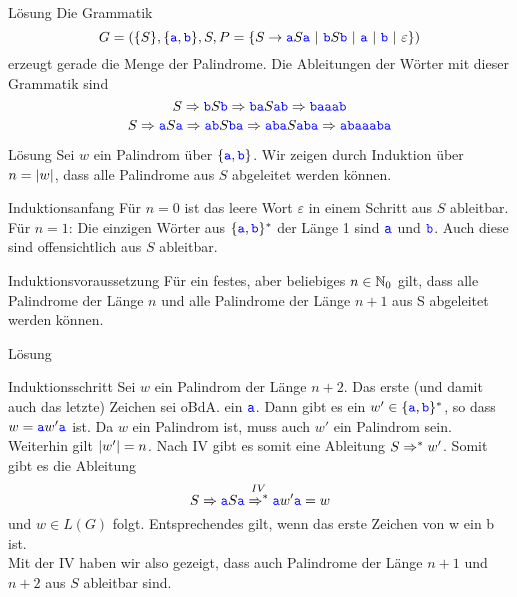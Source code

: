 \begin{frame}{Lösung}
	Die Grammatik $$G = (\{S\}, \{\word a, \word b\}, S, P = \{S \to \word aS\word a \ | \ \word bS\word b \ | \ \word a \ | \ \word b \ | \ \varepsilon \})$$ erzeugt gerade die Menge der Palindrome. \pause Die Ableitungen der Wörter mit dieser Grammatik sind 
	$$S \derives \word bS\word b \derives \word{ba}S\word{ab} \derives \word{baaab}$$
	$$S \derives \word aS\word a \derives \word{ab}S\word{ba} \derives \word{aba}S\word{aba} \derives \word{abaaaba}$$
\end{frame}

\begin{frame}{Lösung}
	Sei $w$ ein Palindrom über $\{\word a,\word b\}$. Wir zeigen durch Induktion über $n = \size{w}$, dass alle Palindrome aus $S$ abgeleitet werden können. \pause
	\begin{block}{Induktionsanfang} \pause
		Für $n = 0$ ist das leere Wort $\varepsilon$ in einem Schritt aus $S$ ableitbar. \\
		Für $n=1$: Die einzigen Wörter aus $\{\word a,\word b\}^\ast$ der Länge 1 sind $\word a$ und $\word b$. Auch diese sind offensichtlich aus $S$ ableitbar.
	\end{block}
 	\pause
	\begin{block}{Induktionsvoraussetzung} \pause
		Für ein festes, aber beliebiges $n \in \N_0$ gilt, dass alle Palindrome der Länge $n$ und alle Palindrome der Länge $n + 1$ aus S abgeleitet werden können.
	\end{block}
\end{frame}

\begin{frame}{Lösung}
		\begin{block}{Induktionsschritt}
			Sei $w$ ein Palindrom der Länge $n + 2$. Das erste (und damit auch das letzte) Zeichen sei oBdA. ein $\word a$. Dann gibt es ein $w' \in \{\word a, \word b\}^\ast$, so dass $w = \word aw'\word a$ ist. Da $w$ ein Palindrom ist, muss auch $w'$ ein Palindrom sein. Weiterhin gilt $\size{w'} = n$. \pause Nach IV gibt es somit eine Ableitung $S \derives^\ast w'$. Somit gibt es die Ableitung $$S \derives \word aS\word a \overset{IV}{\derives^\ast} \word aw'\word a = w$$ und $w \in L(G)$ folgt. \pause Entsprechendes gilt, wenn das erste Zeichen von w ein \word b ist. \\
			Mit der IV haben wir also gezeigt, dass auch Palindrome der Länge $n+1$ und $n+2$ aus $S$ ableitbar sind.
	\end{block}

\end{frame}

